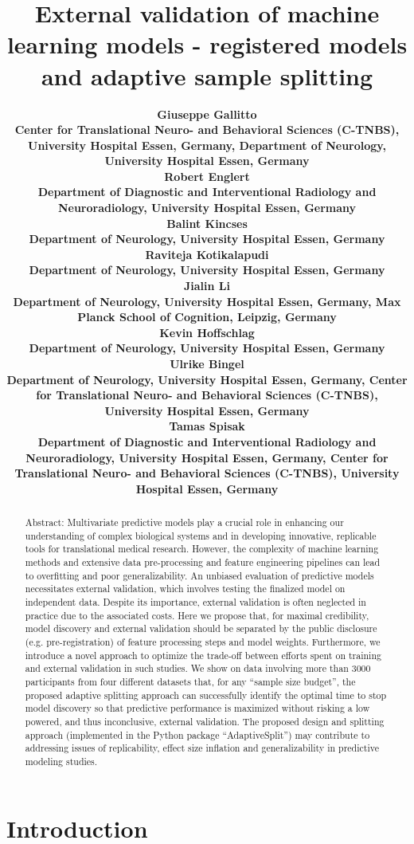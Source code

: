 \documentclass{article}
\title{External validation of machine learning models - registered models and adaptive sample splitting}
\date{\displaydate{articleDate}}
\author{\bfseries Giuseppe Gallitto\mdseries\\Center for Translational Neuro- and Behavioral Sciences (C-TNBS), University Hospital Essen, Germany, Department of Neurology, University Hospital Essen, Germany\\\AND\bfseries Robert Englert\mdseries\\Department of Diagnostic and Interventional Radiology and Neuroradiology, University Hospital Essen, Germany\\\AND\bfseries Balint Kincses\mdseries\\Department of Neurology, University Hospital Essen, Germany\\\AND\bfseries Raviteja Kotikalapudi\mdseries\\Department of Neurology, University Hospital Essen, Germany\\\AND\bfseries Jialin Li\mdseries\\Department of Neurology, University Hospital Essen, Germany, Max Planck School of Cognition, Leipzig, Germany\\\AND\bfseries Kevin Hoffschlag\mdseries\\Department of Neurology, University Hospital Essen, Germany\\\AND\bfseries Ulrike Bingel\mdseries\\Department of Neurology, University Hospital Essen, Germany, Center for Translational Neuro- and Behavioral Sciences (C-TNBS), University Hospital Essen, Germany\\\AND\bfseries Tamas Spisak\mdseries\\Department of Diagnostic and Interventional Radiology and Neuroradiology, University Hospital Essen, Germany, Center for Translational Neuro- and Behavioral Sciences (C-TNBS), University Hospital Essen, Germany\\}
\begin{document}
\maketitle
\begin{abstract}
Abstract: Multivariate predictive models play a crucial role in enhancing our understanding of complex biological systems and in developing innovative, replicable tools for translational medical research. However, the complexity of machine learning methods and extensive data pre-processing and feature engineering pipelines can lead to overfitting and poor generalizability. An unbiased evaluation of predictive models necessitates external validation, which involves testing the finalized model on independent data. Despite its importance, external validation is often neglected in practice due to the associated costs.
Here we propose that, for maximal credibility, model discovery and external validation should be separated by the public disclosure (e.g. pre-registration) of feature processing steps and model weights. Furthermore, we introduce a novel approach to optimize the trade-off between efforts spent on training and external validation in such studies. We show on data involving more than 3000 participants from four different datasets that, for any ``sample size budget'', the proposed adaptive splitting approach can successfully identify the optimal time to stop model discovery so that predictive performance is maximized without risking a low powered, and thus inconclusive, external validation.
The proposed design and splitting approach (implemented in the Python package ``AdaptiveSplit'') may contribute to addressing issues of replicability, effect size inflation and generalizability in predictive modeling studies.
\end{abstract}\keywords{}


\section{Introduction}
\end{document}
